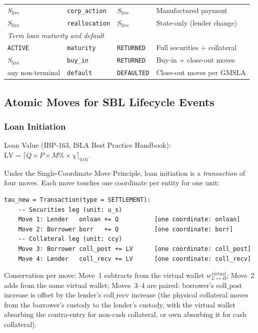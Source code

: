 \documentclass[11pt,a4paper]{article}
\begin{document}
\begin{center}
\begin{tabular}{l l l l}
$S_{\mathrm{live}}$ & \texttt{corp\_action} & $S_{\mathrm{live}}$ & Manufactured payment \\
$S_{\mathrm{live}}$ & \texttt{reallocation} & $S_{\mathrm{live}}$ & State-only (lender change) \\
\midrule
\multicolumn{4}{l}{\textit{Term loan maturity and default}} \\
\texttt{ACTIVE} & \texttt{maturity} & \texttt{RETURNED} & Full securities + collateral \\
$S_{\mathrm{live}}$ & \texttt{buy\_in} & \texttt{RETURNED} & Buy-in + close-out moves \\
any non-terminal & \texttt{default} & \texttt{DEFAULTED} & Close-out moves per GMSLA \\
\bottomrule
\end{tabular}
\end{center}

\subsection{Atomic Moves for SBL Lifecycle Events}
\label{sec:sbl-moves}

\subsubsection{Loan Initiation}

Loan Value (IBP-163, ISLA Best Practice Handbook): $\mathrm{LV} = \lceil Q \times P \times M\% \times \chi \rceil_{0.01}$.

Under the Single-Coordinate Move Principle, loan initiation is a \emph{transaction} of four moves. Each move touches one coordinate per entity for one unit:

\begin{lstlisting}
tau_new = Transaction(type = SETTLEMENT):
    -- Securities leg (unit: u_s)
    Move 1: Lender   onloan += Q          [one coordinate: onloan]
    Move 2: Borrower borr   += Q          [one coordinate: borr]
    -- Collateral leg (unit: ccy)
    Move 3: Borrower coll_post += LV      [one coordinate: coll_post]
    Move 4: Lender   coll_recv += LV      [one coordinate: coll_recv]
\end{lstlisting}

\noindent Conservation per move: Move~1 subtracts from the virtual wallet $w^{\mathrm{virtual}}_{L \leftrightarrow B}$; Move~2 adds from the same virtual wallet; Moves~3--4 are paired: borrower's $\mathrm{coll\_post}$ increase is offset by the lender's $\mathrm{coll\_recv}$ increase (the physical collateral moves from the borrower's custody to the lender's custody, with the virtual wallet absorbing the contra-entry for non-cash collateral, or $\mathrm{own}$ absorbing it for cash collateral).
\end{document}
